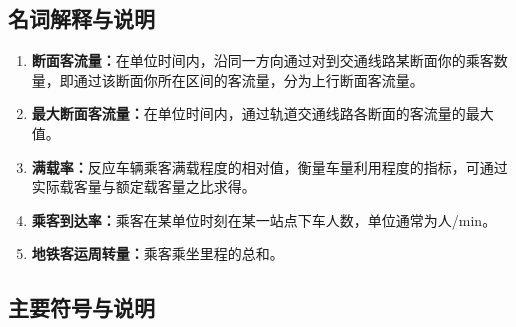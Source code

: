 \documentclass[12pt,a4paper]{mcmthesis}
\newcommand\wordc[1]{\textbf{#1}}
\begin{document}
    \subsection{名词解释与说明}
    \begin{enumerate}
        \item \wordc{断面客流量：}在单位时间内，沿同一方向通过对到交通线路某断面你的乘客数量，即通过该断面你所在区间的客流量，分为上行断面客流量。

        \item \wordc{最大断面客流量：}在单位时间内，通过轨道交通线路各断面的客流量的最大值。

        \item \wordc{满载率：}反应车辆乘客满载程度的相对值，衡量车量利用程度的指标，可通过实际载客量与额定载客量之比求得。

        \item \wordc{乘客到达率：}乘客在某单位时刻在某一站点下车人数，单位通常为人/min。
        \item \wordc{地铁客运周转量：}乘客乘坐里程的总和。


    \end{enumerate}

    \subsection{主要符号与说明}
\end{document}
